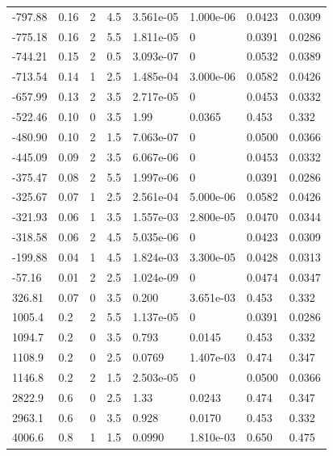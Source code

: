\documentclass[preview]{standalone}
\begin{document}
{{\begin{tabular}{L{1.2cm}C{1.2cm} C{0.3cm}C{0.5cm} C{1.4cm}C{1.4cm} C{1.4cm}C{1.4cm}}
  -797.88  &  0.16  & 2     & 4.5 &  3.561e-05  & 1.000e-06  & 0.0423 &  0.0309   \\ 
  -775.18  &  0.16  & 2     & 5.5 &  1.811e-05  & 0  & 0.0391 &  0.0286   \\ 
  -744.21  &  0.15  & 2     & 0.5 &  3.093e-07  & 0  & 0.0532 &  0.0389   \\ 
  -713.54  &  0.14  & 1     & 2.5 &  1.485e-04  & 3.000e-06  & 0.0582 &  0.0426   \\ 
  -657.99  &  0.13  & 2     & 3.5 &  2.717e-05  & 0  & 0.0453 &  0.0332   \\ 
  -522.46  &  0.10  & 0     & 3.5 &  1.99  & 0.0365  & 0.453 &  0.332   \\ 
  -480.90  &  0.10  & 2     & 1.5 &  7.063e-07  & 0  & 0.0500 &  0.0366   \\ 
  -445.09  &  0.09  & 2     & 3.5 &  6.067e-06  & 0  & 0.0453 &  0.0332   \\ 
  -375.47  &  0.08  & 2     & 5.5 &  1.997e-06  & 0  & 0.0391 &  0.0286   \\ 
  -325.67  &  0.07  & 1     & 2.5 &  2.561e-04  & 5.000e-06  & 0.0582 &  0.0426   \\ 
  -321.93  &  0.06  & 1     & 3.5 &  1.557e-03  & 2.800e-05  & 0.0470 &  0.0344   \\ 
  -318.58  &  0.06  & 2     & 4.5 &  5.035e-06  & 0  & 0.0423 &  0.0309   \\ 
  -199.88  &  0.04  & 1     & 4.5 &  1.824e-03  & 3.300e-05  & 0.0428 &  0.0313   \\ 
  -57.16  &  0.01  & 2     & 2.5 &  1.024e-09  & 0  & 0.0474 &  0.0347   \\ 
  326.81  &  0.07  & 0     & 3.5 &  0.200  & 3.651e-03  & 0.453 &  0.332   \\ 
  1005.4  &   0.2  & 2     & 5.5 &  1.137e-05  & 0  & 0.0391 &  0.0286   \\ 
  1094.7  &   0.2  & 0     & 3.5 &  0.793  & 0.0145  & 0.453 &  0.332   \\ 
  1108.9  &   0.2  & 0     & 2.5 &  0.0769  & 1.407e-03  & 0.474 &  0.347   \\ 
  1146.8  &   0.2  & 2     & 1.5 &  2.503e-05  & 0  & 0.0500 &  0.0366   \\ 
  2822.9  &   0.6  & 0     & 2.5 &  1.33  & 0.0243  & 0.474 &  0.347   \\ 
  2963.1  &   0.6  & 0     & 3.5 &  0.928  & 0.0170  & 0.453 &  0.332   \\ 
  4006.6  &   0.8  & 1     & 1.5 &  0.0990  & 1.810e-03  & 0.650 &  0.475   \\ 

\end{tabular}}}
\end{document}
